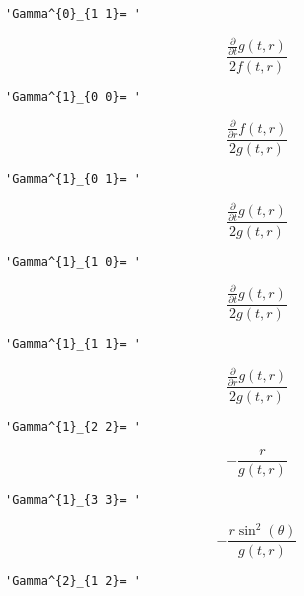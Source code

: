 \documentclass[11pt]{article}
\begin{document}
    \begin{verbatim}
'Gamma^{0}_{1 1}= '
    \end{verbatim}

    
    \[\frac{\frac{\partial}{\partial t} g{\left (t,r \right )}}{2 f{\left (t,r \right )}}\]

    
    
    \begin{verbatim}
'Gamma^{1}_{0 0}= '
    \end{verbatim}

    
    \[\frac{\frac{\partial}{\partial r} f{\left (t,r \right )}}{2 g{\left (t,r \right )}}\]

    
    
    \begin{verbatim}
'Gamma^{1}_{0 1}= '
    \end{verbatim}

    
    \[\frac{\frac{\partial}{\partial t} g{\left (t,r \right )}}{2 g{\left (t,r \right )}}\]

    
    
    \begin{verbatim}
'Gamma^{1}_{1 0}= '
    \end{verbatim}

    
    \[\frac{\frac{\partial}{\partial t} g{\left (t,r \right )}}{2 g{\left (t,r \right )}}\]

    
    
    \begin{verbatim}
'Gamma^{1}_{1 1}= '
    \end{verbatim}

    
    \[\frac{\frac{\partial}{\partial r} g{\left (t,r \right )}}{2 g{\left (t,r \right )}}\]

    
    
    \begin{verbatim}
'Gamma^{1}_{2 2}= '
    \end{verbatim}

    
    \[- \frac{r}{g{\left (t,r \right )}}\]

    
    
    \begin{verbatim}
'Gamma^{1}_{3 3}= '
    \end{verbatim}

    
    \[- \frac{r \sin^{2}{\left (\theta \right )}}{g{\left (t,r \right )}}\]

    
    
    \begin{verbatim}
'Gamma^{2}_{1 2}= '
    \end{verbatim}
\end{document}
